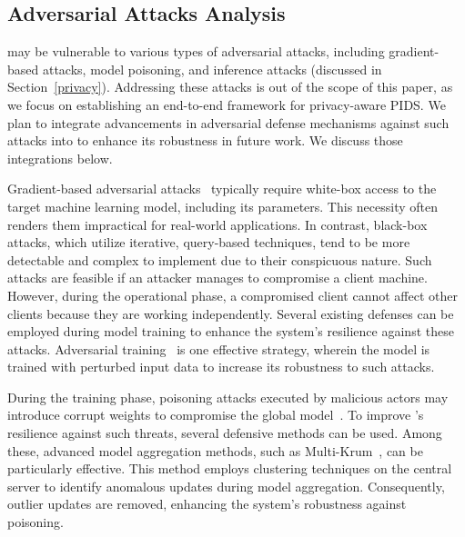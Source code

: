 \subsection{Adversarial Attacks Analysis}
\label{sec:adversarial}

\Sys may be vulnerable to various types of adversarial attacks, including gradient-based attacks, model poisoning, and inference attacks (discussed in Section~\ref{privacy}). Addressing these attacks is out of the scope of this paper, as we focus on establishing an end-to-end framework for privacy-aware PIDS. We plan to integrate advancements in adversarial defense mechanisms against such attacks into \Sys to enhance its robustness in future work. We discuss those integrations below.

 Gradient-based adversarial attacks~\cite{chakraborty2021survey} typically require white-box access to the target machine learning model, including its parameters. This necessity often renders them impractical for real-world applications. In contrast, black-box attacks, which utilize iterative, query-based techniques, tend to be more detectable and complex to implement due to their conspicuous nature. Such attacks are feasible if an attacker manages to compromise a client machine. However, during the operational phase, a compromised client cannot affect other clients because they are working independently. Several existing defenses can be employed during model training to enhance the system's resilience against these attacks. Adversarial training~\cite{tramer2019adversarial} is one effective strategy, wherein the model is trained with perturbed input data to increase its robustness to such attacks.

 During the training phase, poisoning attacks executed by malicious actors may introduce corrupt weights to compromise the global model~\cite{jagielski2018manipulating}. To improve \Sys's resilience against such threats, several defensive methods can be used. Among these, advanced model aggregation methods, such as Multi-Krum~\cite{munoz2019byzantine}, can be particularly effective. This method employs clustering techniques on the central server to identify anomalous updates during model aggregation. Consequently, outlier updates are removed, enhancing the system's robustness against poisoning.

